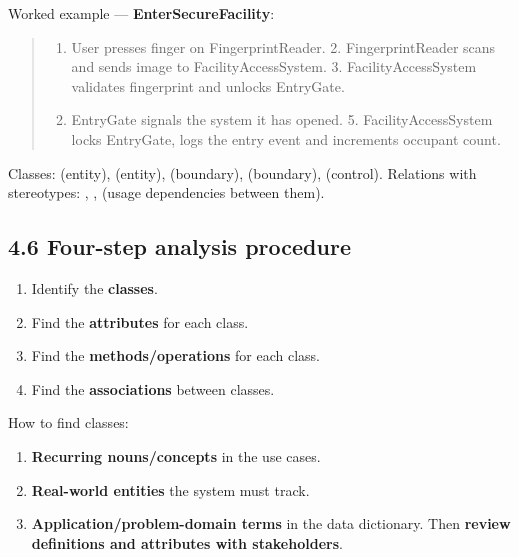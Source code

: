 \begin{studycolumns}
\vspace{0pt}

Worked example --- \textbf{EnterSecureFacility}:


\begin{quote}\small\color{navy}
\begin{enumerate}
\item User presses finger on FingerprintReader. 2. FingerprintReader scans and sends image to FacilityAccessSystem. 3. FacilityAccessSystem validates fingerprint and unlocks EntryGate.
\item EntryGate signals the system it has opened. 5. FacilityAccessSystem locks EntryGate, logs the entry event and increments occupant count.
\end{enumerate}
\end{quote}
Classes:  (\guillemotleft{}entity\guillemotright{}),  (\guillemotleft{}entity\guillemotright{}),  (\guillemotleft{}boundary\guillemotright{}),  (\guillemotleft{}boundary\guillemotright{}),  (\guillemotleft{}control\guillemotright{}). Relations with stereotypes: , ,  (usage dependencies between them).


\subsection*{4.6 Four-step analysis procedure}
\begin{enumerate}
\item Identify the \textbf{classes}.
\item Find the \textbf{attributes} for each class.
\item Find the \textbf{methods/\allowbreak{}operations} for each class.
\item Find the \textbf{associations} between classes.
\end{enumerate}
How to find classes:

\begin{enumerate}
\item \textbf{Recurring nouns/\allowbreak{}concepts} in the use cases.
\item \textbf{Real-world entities} the system must track.
\item \textbf{Application/\allowbreak{}problem-domain terms} in the data dictionary. Then \textbf{review definitions and attributes with stakeholders}.
\end{enumerate}


\end{studycolumns}
